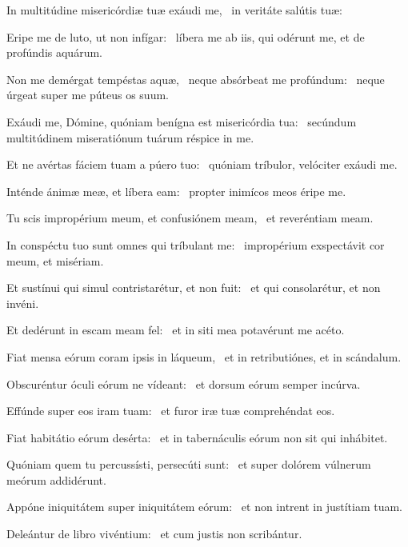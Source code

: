 
\item In multitúdine misericórdiæ tuæ exáudi me,~\psstar{} in veritáte salútis tuæ:

\item Eripe me de luto, ut non infígar:~\psstar{} líbera me ab iis, qui odérunt me, et de profúndis aquárum.

\item Non me demérgat tempéstas aquæ,~\pscross{} neque absórbeat me profúndum:~\psstar{} neque úrgeat super me púteus os suum.

\item Exáudi me, Dómine, quóniam benígna est misericórdia tua:~\psstar{} secúndum multitúdinem miseratiónum tuárum réspice in me.

\item Et ne avértas fáciem tuam a púero tuo:~\psstar{} quóniam tríbulor, velóciter exáudi me.

\item Inténde ánimæ meæ, et líbera eam:~\psstar{} propter inimícos meos éripe me.

\item Tu scis impropérium meum, et confusiónem meam,~\psstar{} et reveréntiam meam.

\item In conspéctu tuo sunt omnes qui tríbulant me:~\psstar{} impropérium exspectávit cor meum, et misériam.

\item Et sustínui qui simul contristarétur, et non fuit:~\psstar{} et qui consolarétur, et non invéni.

\item Et dedérunt in escam meam fel:~\psstar{} et in siti mea potavérunt me acéto.

\item Fiat mensa eórum coram ipsis in láqueum,~\psstar{} et in retributiónes, et in scándalum.

\item Obscuréntur óculi eórum ne vídeant:~\psstar{} et dorsum eórum semper incúrva.

\item Effúnde super eos iram tuam:~\psstar{} et furor iræ tuæ comprehéndat eos.

\item Fiat habitátio eórum desérta:~\psstar{} et in tabernáculis eórum non sit qui inhábitet.

\item Quóniam quem tu percussísti, persecúti sunt:~\psstar{} et super dolórem vúlnerum meórum addidérunt.

\item Appóne iniquitátem super iniquitátem eórum:~\psstar{} et non intrent in justítiam tuam.

\item Deleántur de libro vivéntium:~\psstar{} et cum justis non scribántur.
